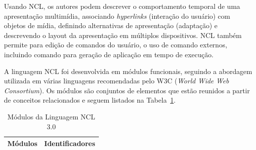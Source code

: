 Usando NCL, os autores podem descrever o comportamento temporal de uma apresentação multimídia, associando \textit{hyperlinks} (interação do usuário) com objetos de mídia, definindo alternativas de apresentação (adaptação) e descrevendo o layout da apresentação em múltiplos dispositivos. NCL também permite para edição de comandos do usuário, o uso de comando externos, incluindo comando para geração de aplicação em tempo de execução.

A linguagem NCL foi desenvolvida em módulos funcionais, seguindo a abordagem utilizada em várias linguagens \cite{world2006namespaces} recomendadas pelo W3C (\textit{World Wide Web Consortium}). Os módulos são conjuntos de elementos que estão reunidos a partir de conceitos relacionados e seguem listados na Tabela~\ref{tab:modulos}.

\begin{table}[!ht] \footnotesize
\caption{Módulos da Linguagem NCL 3.0 \cite{soares2009programando}}
\label{tab:modulos}
\centering
{
  \renewcommand\arraystretch{0.5}
  \begin{tabular}{|p{5cm}|p{10cm}|} \hline
  \multicolumn{1}{|c|}{Módulos} & \multicolumn{1}{c|}{Identificadores} \\\hline 
 

\end{tabular}}
\end{table}
